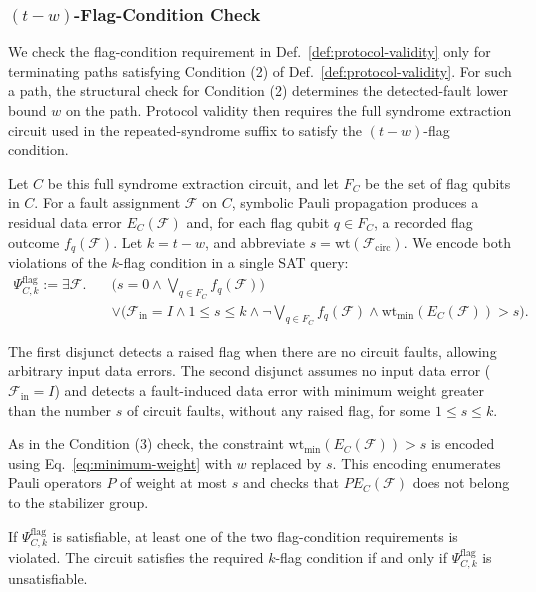 \documentclass[acmsmall,screen,review,anonymous,nonacm]{acmart}
\begin{document}
\subsubsection{$(t-w)$-Flag-Condition Check}
\label{subsec:tw-flag-condition-check}

We check the flag-condition requirement in Def.~\ref{def:protocol-validity}
only for terminating paths satisfying Condition (2) of
Def.~\ref{def:protocol-validity}. For
such a path, the structural check for Condition (2)
determines the detected-fault lower bound $w$ on the path. Protocol validity
then requires the full syndrome extraction circuit used in the
repeated-syndrome suffix to satisfy the $(t-w)$-flag condition.



Let $C$ be this full syndrome extraction circuit, and let $F_C$ be the
set of flag qubits in $C$. For a fault assignment $\mathcal{F}$ on $C$,
symbolic Pauli propagation produces a residual data error
$E_C(\mathcal{F})$ and, for each flag qubit $q\in F_C$, a recorded flag
outcome $f_q(\mathcal{F})$. Let $k=t-w$, and abbreviate
$s=\mathrm{wt}(\mathcal{F}_{\mathrm{circ}})$. We encode both violations of the
$k$-flag condition in a single SAT query:
\begin{equation}
\label{eq:flag-check}
\begin{aligned}
\Psi^{\mathrm{flag}}_{C,k}:=\exists\mathcal{F}.\quad
&\bigl(s=0\land\bigvee_{q\in F_C}f_q(\mathcal{F})\bigr)\\
&\lor\bigl(\mathcal{F}_{\mathrm{in}}=I\land 1\le s\le k
\land\neg\bigvee_{q\in F_C}f_q(\mathcal{F})
\land\mathrm{wt}_{\min}(E_C(\mathcal{F}))>s\bigr).
\end{aligned}
\end{equation}

The first disjunct detects a raised flag when there are no circuit faults,
allowing arbitrary input data errors. The second disjunct assumes no input
data error ($\mathcal{F}_{\mathrm{in}}=I$) and detects a fault-induced
data error with minimum weight greater than the number $s$ of circuit
faults, without any raised flag, for some $1\le s\le k$.

As in the Condition (3) check, the constraint
$\mathrm{wt}_{\min}(E_C(\mathcal{F}))>s$ is encoded using
Eq.~\eqref{eq:minimum-weight} with $w$ replaced by $s$.
This encoding enumerates Pauli operators $P$ of weight at most $s$
and checks that $P E_C(\mathcal{F})$ does not belong to the stabilizer group.

If $\Psi^{\mathrm{flag}}_{C,k}$ is satisfiable, at least one of the two
flag-condition requirements is violated. The circuit satisfies the required
$k$-flag condition if and only if $\Psi^{\mathrm{flag}}_{C,k}$ is
unsatisfiable.
\end{document}
